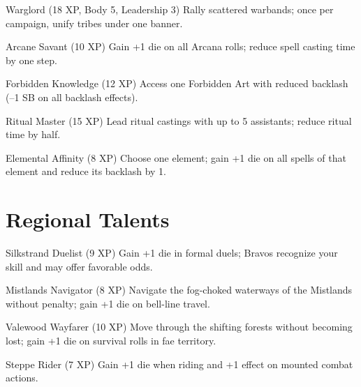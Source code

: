 \documentclass[11pt]{article}
\begin{document}
\begin{talentbox}{Warglord (18 XP, Body 5, Leadership 3)}
Rally scattered warbands; once per campaign, unify tribes under one banner.
\end{talentbox}

\begin{talentbox}{Arcane Savant (10 XP)}
Gain +1 die on all Arcana rolls; reduce spell casting time by one step.
\end{talentbox}

\begin{talentbox}{Forbidden Knowledge (12 XP)}
Access one Forbidden Art with reduced backlash (–1 SB on all backlash effects).
\end{talentbox}

\begin{talentbox}{Ritual Master (15 XP)}
Lead ritual castings with up to 5 assistants; reduce ritual time by half.
\end{talentbox}

\begin{talentbox}{Elemental Affinity (8 XP)}
Choose one element; gain +1 die on all spells of that element and reduce its backlash by 1.
\end{talentbox}

\section*{Regional Talents}

\begin{talentbox}{Silkstrand Duelist (9 XP)}
Gain +1 die in formal duels; Bravos recognize your skill and may offer favorable odds.
\end{talentbox}

\begin{talentbox}{Mistlands Navigator (8 XP)}
Navigate the fog-choked waterways of the Mistlands without penalty; gain +1 die on bell-line travel.
\end{talentbox}

\begin{talentbox}{Valewood Wayfarer (10 XP)}
Move through the shifting forests without becoming lost; gain +1 die on survival rolls in fae territory.
\end{talentbox}

\begin{talentbox}{Steppe Rider (7 XP)}
Gain +1 die when riding and +1 effect on mounted combat actions.
\end{talentbox}
\end{document}

